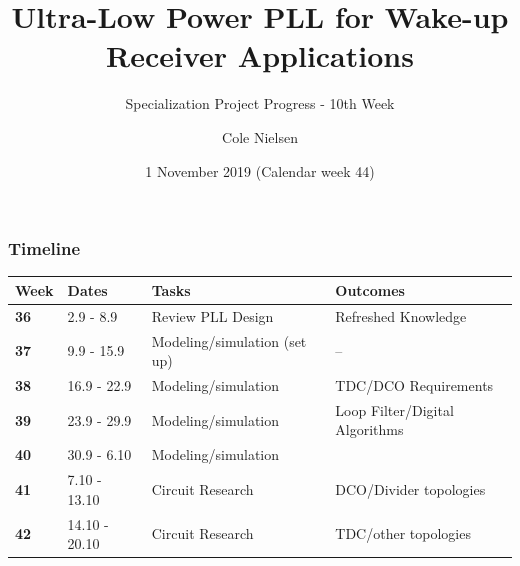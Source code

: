 \documentclass[t, screen, aspectratio=43]{beamer}
\title[Short title]{Ultra-Low Power PLL for Wake-up Receiver Applications}
\subtitle{Specialization Project Progress - 10th Week}
\author[C Nielsen]{Cole Nielsen}
\institute[NTNU]{Department of Electronic Systems, NTNU}
\date{1 November 2019 (Calendar week 44)}
\begin{document}
\begin{frame}
	\titlepage%
\end{frame}



\begin{frame}
	\frametitle{Timeline}
	\begin{table}[htb!]
		\tiny
		\centering
		\vspace{-1em}
		\def\arraystretch{1.5}		
		\setlength\arrayrulewidth{0.75pt}
		\setlength{\tabcolsep}{1em} %
		\begin{tabular}{|l|l|l|l|}
			\hline 
			\rule[-1ex]{0pt}{2.5ex} \cellcolor{gray!40}\textbf{Week} & \cellcolor{gray!40}\textbf{Dates} &\cellcolor{gray!40}\textbf{Tasks} & \cellcolor{gray!40}\textbf{Outcomes}\\ 
			\hline 
			\rule[-1ex]{0pt}{2.5ex} \cellcolor{red!20}\textbf{36}& \cellcolor{red!20}2.9 - 8.9 & \cellcolor{red!20}Review PLL Design & \cellcolor{red!20}Refreshed Knowledge\\ 
			\hline 
			\rule[-1ex]{0pt}{2.5ex} \cellcolor{red!20}\textbf{37}& \cellcolor{red!20}9.9 - 15.9 & \cellcolor{red!20}Modeling/simulation (set up) & \cellcolor{red!20}--\\ 
			\hline 
			\rule[-1ex]{0pt}{2.5ex} \cellcolor{red!20}\textbf{38}& \cellcolor{red!20}16.9 - 22.9 & \cellcolor{red!20}Modeling/simulation &\cellcolor{red!20}TDC/DCO Requirements\\ 
			\hline 
			\rule[-1ex]{0pt}{2.5ex} \cellcolor{red!20}\textbf{39}& \cellcolor{red!20}23.9 - 29.9& \cellcolor{red!20}Modeling/simulation& \cellcolor{red!20}Loop Filter/Digital Algorithms\\ 
			\hline 
			\rule[-1ex]{0pt}{2.5ex} \cellcolor{red!20}\textbf{40}& \cellcolor{red!20}30.9 - 6.10& \cellcolor{red!20}Modeling/simulation& \cellcolor{red!20}{Loop filter, DCO, TDC, calibration}\color{black}\\ 
			\hline 
			\rule[-1ex]{0pt}{2.5ex} \cellcolor{red!20}\textbf{41}&\cellcolor{red!20}7.10 - 13.10&\cellcolor{red!20}Circuit Research &\cellcolor{red!20}DCO/Divider topologies\\ 
			\hline 
			\rule[-1ex]{0pt}{2.5ex} \cellcolor{red!20}\textbf{42}&\cellcolor{red!20}14.10 - 20.10&\cellcolor{red!20}Circuit Research &\cellcolor{red!20}TDC/other topologies\\ 

\end{tabular}
\end{table}
\end{frame}
\end{document}
